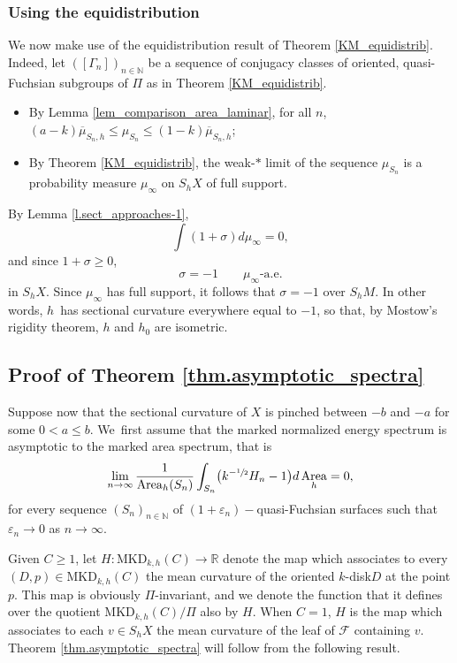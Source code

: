 \documentclass[11pt]{article}
\newcommand{\kdisk}{$k$\nobreakdash-disk\xspace}
\theoremstyle{plain}
\theoremstyle{definition}
\newcommand{\R}{{\mathbb R}}
\newcommand{\N}{{\mathbb N}}
\newcommand{\cF}{{\mathcal F}}
\let\eps\varepsilon
\newcommand{\MKD}{\mathrm{MKD}}
\DeclareMathOperator{\Area}{Area}
\begin{document}
\subsubsection{Using the equidistribution} We now make use of the equidistribution result of Theorem \ref{KM_equidistrib}. Indeed, let $([\Gamma_n])_{n\in\N}$ be a sequence of conjugacy classes of oriented, quasi-Fuchsian subgroups of $\Pi$ as in Theorem \ref{KM_equidistrib}.
\begin{itemize}
\item By Lemma \ref{lem_comparison_area_laminar}, for all $n$, $(a-k)\overline\mu_{S_n,h}\leq\mu_{S_n}\leq(1-k)\overline\mu_{S_n,h}$;
\item By Theorem \ref{KM_equidistrib}, the weak-$\ast$ limit of the sequence $\mu_{S_n}$ is a probability measure $\mu_\infty$ on $S_hX$ of full support.
\end{itemize}
By Lemma \ref{l.sect_approaches-1},
\begin{equation*}
\int(1+\sigma)d\mu_\infty=0,
\end{equation*}
and since $1+\sigma\geq 0$,
\begin{equation*}
\sigma=-1\qquad \mu_\infty\text{-a.e.}
\end{equation*} in $S_hX$. Since $\mu_\infty$ has full support, it follows that $\sigma=-1$ over $S_hM$. In other words, $h$~has sectional curvature everywhere equal to $-1$, so that, by Mostow's rigidity theorem, $h$ and $h_0$ are isometric.

\subsection{Proof of Theorem \ref{thm.asymptotic_spectra}}\label{ss.proof_of_thm_B}

Suppose now that the sectional curvature of $X$ is pinched between $-b$ and $-a$ for some $0<a\leq b$. We~first assume that the marked normalized energy spectrum is asymptotic to the marked area spectrum, that is
\begin{equation}\label{eq.hypothesis}
\lim_{n\to\infty}\frac{1}{\Area_h(S_n)}\int_{S_n}\bigl(k^{-\sfrac{1}{2}}H_n-1\bigr)d\Area_h=0,
\end{equation}
for every sequence $(S_n)_{n \in\N}$ of $(1+\eps_n)-$quasi-Fuchsian surfaces such that $\eps_n\to 0$ as $n\to\infty$.

Given $C\geq 1$, let $H:\MKD_{k,h}(C)\to\R$ denote the map which associates to every $(D,p)\in \MKD_{k,h}(C)$ the mean curvature of the oriented \kdisk $D$ at the point $p$. This map is obviously $\Pi$-invariant, and we denote the function that it defines over the quotient $\MKD_{k,h}(C)/\Pi$ also by $H$. When $C=1$, $H$ is the map which associates to each $v\in S_hX$ the mean curvature of the leaf of $\cF$ containing $v$. Theorem \ref{thm.asymptotic_spectra} will follow from the following result.
\end{document}
